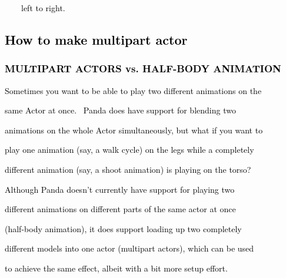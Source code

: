 \documentclass[a4paper]{article}
\newcommand\textstyleOOoComputerKeyWord[1]{\textrm{\textcolor[rgb]{0.0,0.0,0.5019608}{#1}}}
\begin{document}
{\color{black}
\textstyleOOoComputerKeyWord{\textcolor{black}{\ \ \ \ left to right.}}}

\clearpage\subsection[How to make multipart actor]{\textstyleOOoComputerKeyWord{\textcolor{black}{How to make multipart
actor}}}
\hypertarget{RefHeading7897869075401}{}\subsubsection[MULTIPART ACTORS vs. HALF{}-BODY
ANIMATION]{\textstyleOOoComputerKeyWord{\textcolor{black}{MULTIPART ACTORS vs. HALF-BODY ANIMATION}}}
\hypertarget{RefHeading7899869075401}{}
\bigskip

{\color{black}
\textstyleOOoComputerKeyWord{\textcolor{black}{Sometimes you want to be able to play two different animations on the}}}

{\color{black}
\textstyleOOoComputerKeyWord{\textcolor{black}{same Actor at once. \ Panda does have support for blending two}}}

{\color{black}
\textstyleOOoComputerKeyWord{\textcolor{black}{animations on the whole Actor simultaneously, but what if you want to}}}

{\color{black}
\textstyleOOoComputerKeyWord{\textcolor{black}{play one animation (say, a walk cycle) on the legs while a completely}}}

{\color{black}
\textstyleOOoComputerKeyWord{\textcolor{black}{different animation (say, a shoot animation) is playing on the torso?}}}


\bigskip

{\color{black}
\textstyleOOoComputerKeyWord{\textcolor{black}{Although Panda doesn't currently have support for playing two}}}

{\color{black}
\textstyleOOoComputerKeyWord{\textcolor{black}{different animations on different parts of the same actor at once}}}

{\color{black}
\textstyleOOoComputerKeyWord{\textcolor{black}{(half-body animation), it does support loading up two completely}}}

{\color{black}
\textstyleOOoComputerKeyWord{\textcolor{black}{different models into one actor (multipart actors), which can be used}}}

{\color{black}
\textstyleOOoComputerKeyWord{\textcolor{black}{to achieve the same effect, albeit with a bit more setup effort.}}}
\end{document}
